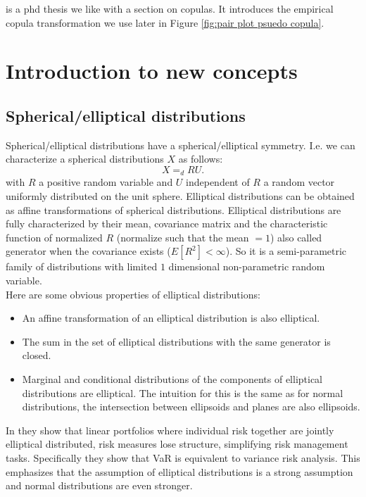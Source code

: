 \documentclass[a4paper,12pt]{article}
\begin{document}
\cite{lopez-paz_dependence_2016} is a phd thesis we like with a section on copulas. It introduces
the empirical copula transformation we use later in Figure \ref{fig:pair plot psuedo copula}. \\


\section{Introduction to new concepts}

\subsection{Spherical/elliptical distributions}
Spherical/elliptical distributions have a spherical/elliptical symmetry. I.e.
we can characterize a spherical distributions $X$ as follows:
\begin{equation}
    X =_{d} R U
    .
\end{equation}
with $R$ a positive random variable and $U$ independent of $R$ a random vector uniformly distributed on the unit sphere.
Elliptical distributions can be obtained as affine transformations of spherical distributions. Elliptical distributions
are fully characterized by their mean, covariance matrix and the characteristic function of normalized $R$
(normalize such that the mean $=1$) also called generator when the covariance exists ($E[R^{2}]<\infty$).
So it is a semi-parametric family of distributions with
limited $1$ dimensional non-parametric random variable.  \\

Here are some obvious properties of elliptical distributions:
\begin{itemize}
    \item An affine transformation of an elliptical distribution is also elliptical.
    \item The sum in the set of elliptical distributions with the same generator is closed.
    \item Marginal and conditional  distributions of the components of elliptical distributions are elliptical. The intuition
          for this is the same as for normal distributions, the intersection between ellipsoids and planes are also ellipsoids.
\end{itemize}

In \cite{dempster_correlation_2002} they show that linear portfolios where individual risk together are jointly elliptical
distributed, risk measures lose structure, simplifying risk management tasks. Specifically they show that VaR is equivalent
to variance risk analysis. This emphasizes that the assumption of elliptical distributions is a strong assumption and
normal distributions are even stronger.
\end{document}
